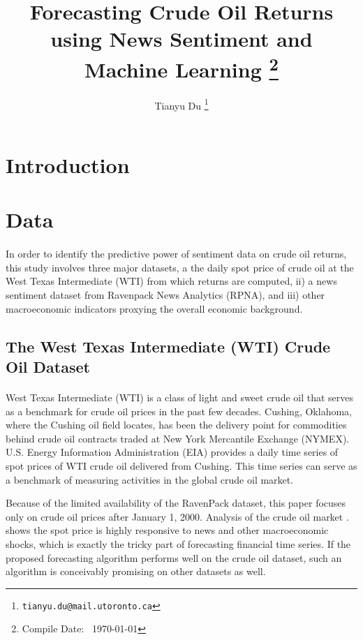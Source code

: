 \documentclass[12pt]{article}
\title{Forecasting Crude Oil Returns using News Sentiment and Machine Learning \footnote{Compile Date: \currenttime\ \today}}
\author{Tianyu Du \footnote{\texttt{tianyu.du@mail.utoronto.ca}}}
\begin{document}
	\maketitle
	\tableofcontents
	\newpage
	\section{Introduction}
	
	\section{Data}
	\paragraph{}In order to identify the predictive power of sentiment data on crude oil returns, this study involves three major datasets, a the daily spot price of crude oil at the West Texas Intermediate (WTI) from which returns are computed, ii) a news sentiment dataset from Ravenpack News Analytics (RPNA), and iii) other macroeconomic indicators proxying the overall economic background.

	\subsection{The West Texas Intermediate (WTI) Crude Oil Dataset}
	\paragraph{}West Texas Intermediate (WTI) is a class of light and sweet crude oil that serves as a benchmark for crude oil prices in the past few decades. Cushing, Oklahoma, where the Cushing oil field locates, has been the delivery point for commodities behind crude oil contracts traded at New York Mercantile Exchange (NYMEX). U.S. Energy Information Administration (EIA) provides a daily time series of spot prices of WTI crude oil delivered from Cushing. This time series can serve as a benchmark of measuring activities in the global crude oil market. 
	
	\par Because of the limited availability of the RavenPack dataset, this paper focuses only on crude oil prices after January 1, 2000. Analysis of the crude oil market \cite{kilian2016}. shows the spot price is highly responsive to news and other macroeconomic shocks, which is exactly the tricky part of forecasting financial time series. If the proposed forecasting algorithm performs well on the crude oil dataset, such an algorithm is conceivably promising on other datasets as well.
	
\end{document}
